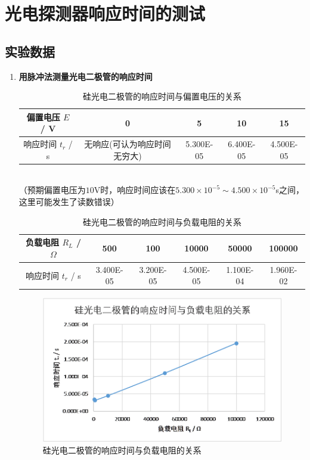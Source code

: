 \documentclass[UTF8,10pt,a4paper]{article}
\begin{document}
\newpage
\section{光电探测器响应时间的测试}
\subsection{实验数据}
\begin{enumerate}
    \item \textbf{用脉冲法测量光电二极管的响应时间}
    \begin{table}[h]
        \centering
        \caption{硅光电二极管的响应时间与偏置电压的关系}
        \label{2-T-1}
        \begin{tabular}{|c|c|c|c|c|}
        \hline
        偏置电压 $E$ / V & 0 & 5 & 10 & 15 \\ \hline
        响应时间 $t_r$ / s & 无响应(可认为响应时间无穷大) & 5.300E-05 & 6.400E-05 & 4.500E-05 \\ \hline
        \end{tabular}
    \end{table}
    \\（预期偏置电压为$10$V时，响应时间应该在$5.300\times 10^{-5}\sim 4.500\times 10^{-5}$s之间，这里可能发生了读数错误）
    \begin{table}[h]
        \centering
        \caption{硅光电二极管的响应时间与负载电阻的关系}
        \label{tab:my-table}
        \begin{tabular}{|c|c|c|c|c|c|}
        \hline
        负载电阻 $R_L$ / $\Omega$ & 500 & 100 & 10000 & 50000 & 100000 \\ \hline
        响应时间 $t_r$ / s & 3.400E-05 & 3.200E-05 & 4.500E-05 & 1.100E-04 & 1.960E-02 \\ \hline
        \end{tabular}
    \end{table}
    \begin{figure}[h]
        \centering
        \includegraphics[width=.45\textwidth]{2-F-2.png}
        \caption{硅光电二极管的响应时间与负载电阻的关系}
        \label{2-F-2}
    \end{figure}

\end{enumerate}
\end{document}
